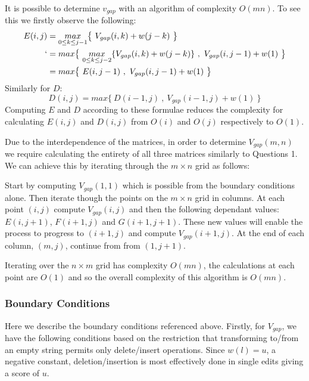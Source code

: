 \documentclass[a4paper]{article}
\begin{document}
It is possible to determine $v_{gap}$ with an algorithm of complexity $O(mn)$. To see this we firstly observe the following:
\begin{align*}
    E(i,j) &= \underset{0\leq k\leq j-1}{max} \big\{ \ V_{gap}(i,k) + w(j-k) \ \big\} \\
        `  &= max \big\{ \ \underset{0\leq k\leq j-2}{max} \{ V_{gap}(i,k) + w(j-k) \} \ , \ V_{gap}(i,j-1) + w(1) \ \big\} \\
           &= max \big\{ \ E(i,j-1) \ , \ V_{gap}(i,j-1) + w(1) \ \big\}
\end{align*}
Similarly for $D$:
\[ D(i,j) = max \big\{ \ D(i-1,j) \ , \ V_{gap}(i-1,j) + w(1) \ \big\} \]
Computing $E$ and $D$ according to these formulae reduces the complexity for calculating $E(i,j)$ and $D(i,j)$ from $O(i)$ and $O(j)$ respectively to $O(1)$.

\bigskip
Due to the interdependence of the matrices, in order to determine $V_{gap}(m,n)$ we require calculating the entirety of all three matrices similarly to Questions 1. We can achieve this by iterating through the $m\times n$ grid as follows:

\bigskip
Start by computing $V_{gap}(1,1)$ which is possible from the boundary conditions alone. Then iterate though the points on the $m \times n$ grid in columns. At each point $(i,j)$ compute $V_{gap}(i,j)$ and then the following dependant values: $E(i,j+1)$, $F(i+1,j)$ and $G(i+1,j+1)$. These new values will enable the process to progress to $(i+1,j)$ and compute $V_{gap}(i+1,j)$. At the end of each column, $(m,j)$, continue from from $(1,j+1)$. 

\bigskip
Iterating over the $n \times m$ grid has complexity $O(mn)$, the calculations at each point are $O(1)$ and so the overall complexity of this algorithm is $O(mn)$.

\subsubsection*{Boundary Conditions}
Here we describe the boundary conditions referenced above. Firstly, for $V_{gap}$, we have the following conditions based on the restriction that transforming to/from an empty string permits only delete/insert operations. Since $w(l)=u$, a negative constant, deletion/insertion is most effectively done in single edits giving a score of $u$.
\end{document}

